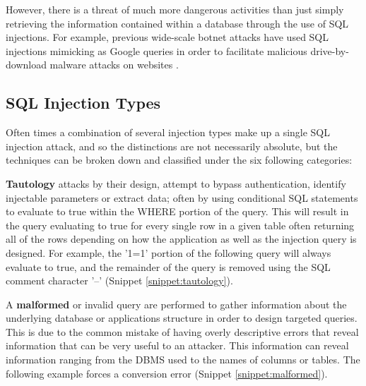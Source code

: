 However, there is a threat of much more dangerous activities than just simply retrieving the information contained within a database through the use of SQL injections.  For example, previous wide-scale botnet attacks have used SQL injections mimicking as Google queries in order to facilitate malicious drive-by-download malware attacks on websites \cite{aSurveyOnWeb}.

\subsection{SQL Injection Types}\label{sec:sqliTypes}

Often times a combination of several injection types make up a single SQL injection attack, and so the distinctions are not necessarily absolute, but the techniques can be broken down and classified under the six following categories:

\textbf{Tautology} attacks by their design, attempt to bypass authentication, identify injectable parameters or extract data; often by using conditional SQL statements to evaluate to true within the WHERE portion of the query.  This will result in the query evaluating to true for every single row in a given table often returning all of the rows depending on how the application as well as the injection query is designed. For example, the '1=1' portion of the following query will always evaluate to true, and the remainder of the query is removed using the SQL comment character '--' (Snippet \ref{snippet:tautology}).

\begin{codesnippet}
	\vspace{0.25in}
	\noindent
	\label{snippet:tautology}
	\vspace{0.25in}
\end{codesnippet}

A \textbf{malformed} or invalid query are performed to gather information about the underlying database or applications structure in order to design targeted queries.  This is due to the common mistake of having overly descriptive errors that reveal information that can be very useful to an attacker. This information can reveal information ranging from the DBMS used to the names of columns or tables.  The following example forces a conversion error (Snippet \ref{snippet:malformed}).

